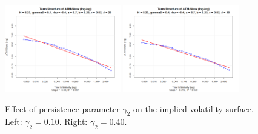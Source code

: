 \begin{minipage}{\textwidth}
\begin{figure}[H]
    \includegraphics[width=0.45\textwidth]{figures/5.2 Individual Parameter Effects/gamma2=0.10_atm_skew_log.png}
	\includegraphics[width=0.45\textwidth]{figures/5.2 Individual Parameter Effects/gamma2=0.40_atm_skew_log.png}
    \caption{Effect of persistence parameter $\gamma_2$ on the implied volatility surface. Left: $\gamma_2=0.10$. Right: $\gamma_2=0.40$.}
    \label{fig:gamma2_effect}
\end{figure}
\end{minipage}

